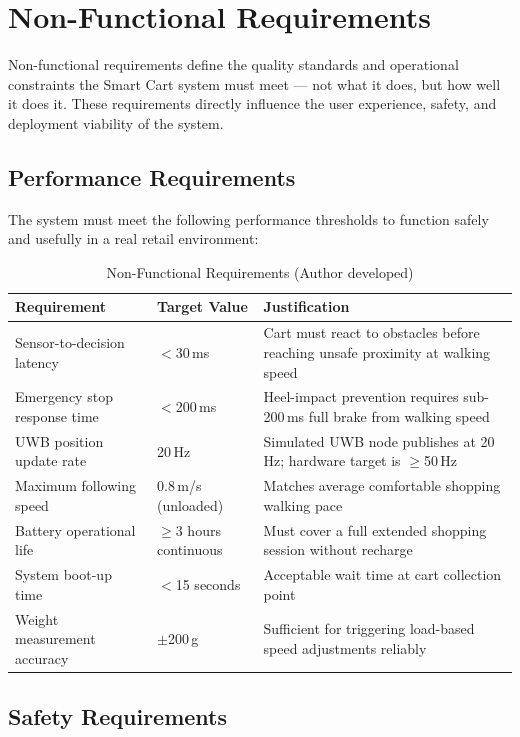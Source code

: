 \section{Non-Functional Requirements}

Non-functional requirements define the quality standards and operational
constraints the Smart Cart system must meet --- not what it does, but how
well it does it. These requirements directly influence the user experience,
safety, and deployment viability of the system.

\subsection{Performance Requirements}

The system must meet the following performance thresholds to function
safely and usefully in a real retail environment:

\begin{table}[!ht]
\caption{Non-Functional Requirements (Author developed)}
\label{tab:nfr}
\centering
\footnotesize
\begin{tabular}{p{2.0cm} p{1.8cm} p{2.8cm}}
\toprule
\textbf{Requirement} & \textbf{Target Value} & \textbf{Justification} \\
\midrule
Sensor-to-decision latency & $<$30\,ms & Cart must react to obstacles before reaching unsafe proximity at walking speed \\
Emergency stop response time & $<$200\,ms & Heel-impact prevention requires sub-200\,ms full brake from walking speed \\
UWB position update rate & 20\,Hz & Simulated UWB node publishes at 20\,Hz; hardware target is $\geq$50\,Hz \\
Maximum following speed & 0.8\,m/s (unloaded) & Matches average comfortable shopping walking pace \\
Battery operational life & $\geq$3 hours continuous & Must cover a full extended shopping session without recharge \\
System boot-up time & $<$15 seconds & Acceptable wait time at cart collection point \\
Weight measurement accuracy & $\pm$200\,g & Sufficient for triggering load-based speed adjustments reliably \\
\bottomrule
\end{tabular}
\end{table}

\subsection{Safety Requirements}

